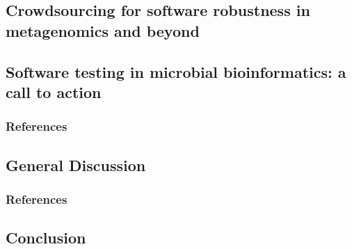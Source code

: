 \documentclass[12pt,a4paper,twoside,openright]{book}
\begin{document}
\begin{sloppy}
\part{Crowdsourcing for software robustness in metagenomics and beyond}
\newpage
\thispagestyle{empty}
\chapter{Software testing in microbial bioinformatics: a call to action\label{ch:paper7}}

\thispagestyle{empty}
\clearpage \thispagestyle{empty}\mbox{}\clearpage
\newpage
\begin{refsection}

\newpage
\section{References}
\printbibliography[heading=none]
\end{refsection}



\newpage
\thispagestyle{empty}
\chapter{General Discussion \label{ch:discussion}}

\clearpage \thispagestyle{empty}\mbox{}\clearpage
\begin{refsection}

\newpage
\section{References}
\printbibliography[heading=none]
\end{refsection}

\newpage
\chapter{Conclusion \label{ch:conclusion}}

\clearpage \thispagestyle{empty}\mbox{}\clearpage
\begin{conclusion}

\newpage

\end{conclusion}
\end{sloppy}
\end{document}
